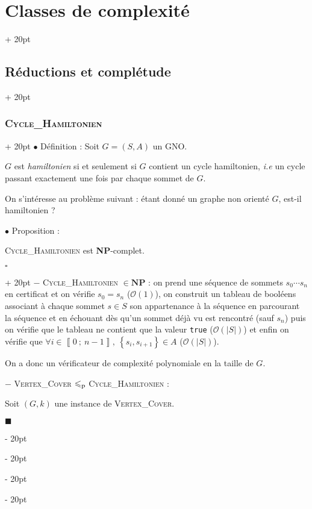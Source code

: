 \documentclass[a4paper, 12pt, twoside]{article}
\newcommand{\nset}[2]{\left\llbracket #1\ ;\ #2 \right\rrbracket}
\newcommand{\set}[1]{\left\{ #1 \right\}}
\newcommand{\abs}[1]{\left\lvert #1 \right\rvert}
\renewcommand{\le}{\leqslant}
\newcommand{\ind}[1][20pt]{\advance\leftskip + #1}
\newcommand{\deind}[1][20pt]{\advance\leftskip - #1}
\newenvironment{indt}[2][20pt]{#2 \par \ind[#1]}{\par \deind} %
\newenvironment{proof}[1][{}]{\begin{indt}{$\square$ #1}}{$\blacksquare$ \end{indt}}
\begin{document}
\begin{indt}{\section{Classes de complexité}}
\begin{indt}{\subsection{Réductions et complétude}}
            \begin{indt}{\subsubsection{\textsc{Cycle\_Hamiltonien}}}
                $\bullet$ Définition : Soit $G = (S, A)$ un GNO.

                $G$ est \emph{hamiltonien} si et seulement si $G$ contient un cycle hamiltonien, \textit{i.e} un cycle passant exactement une fois par chaque sommet de $G$.

                \vspace{6pt}
                
                On s'intéresse au problème suivant : étant donné un graphe non orienté $G$, est-il hamiltonien ?

                \vspace{12pt}
                
                $\bullet$ Proposition :
                \begin{emphBox}
                    \textsc{Cycle\_Hamiltonien} est \textbf{NP}-complet.
                \end{emphBox}

                \vspace{6pt}
                
                \begin{proof}
                    $-$ \textsc{Cycle\_Hamiltonien} $\in \mathbf{NP}$ : on prend une séquence de sommets $s_0 \cdots s_n$ en certificat et on vérifie $s_0 = s_n$ ($\mathcal O(1)$), on construit un tableau de booléens associant à chaque sommet $s \in S$ son appartenance à la séquence en parcourant la séquence et en échouant dès qu'un sommet déjà vu est rencontré (sauf $s_n$) puis on vérifie que le tableau ne contient que la valeur \texttt{true} ($\mathcal O(\abs S)$) et enfin on vérifie que $\forall i \in \nset 0 {n - 1},\ \set{s_i, s_{i + 1}} \in A$ ($\mathcal O(\abs S)$).

                    On a donc un vérificateur de complexité polynomiale en la taille de $G$.

                    \vspace{12pt}
                    
                    $-$ \textsc{Vertex\_Cover} $\le_{\rm p}$ \textsc{Cycle\_Hamiltonien} :

                    Soit $(G, k)$ une instance de \textsc{Vertex\_Cover}.


\end{proof}
\end{indt}
\end{indt}
\end{indt}
\end{document}
